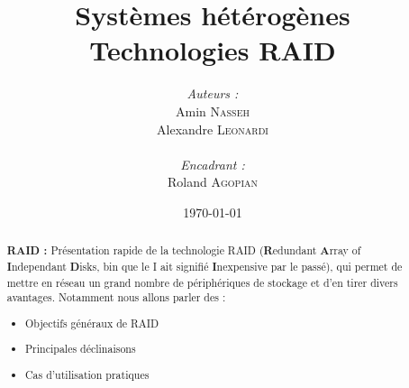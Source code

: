 \documentclass[a4paper,11pt]{article}
\title{
  \textbf{Systèmes hétérogènes}\\
  Technologies RAID
}
\author{
\begin{minipage}{0.4\textwidth}
	\begin{flushleft} \large
		\emph{Auteurs :}\\
                Amin \textsc{Nasseh}\\
		Alexandre \textsc{Leonardi}\\
	\end{flushleft}
\end{minipage}
\begin{minipage}{0.4\textwidth}
	\begin{flushright} \large
		\emph{Encadrant :} \\
		Roland \textsc{Agopian}\\
	\end{flushright}
\end{minipage}
}
\date{\today}
\begin{document}
\maketitle
\thispagestyle{empty}
\begin{abstract}
\textbf{RAID :} Présentation rapide de la technologie RAID (\textbf{R}edundant \textbf{A}rray of \textbf{I}ndependant \textbf{D}isks, bin que le I ait signifié \textbf{I}nexpensive par le passé), qui permet de mettre en réseau un grand nombre de périphériques de stockage et d'en tirer divers avantages. Notamment nous allons parler des :
\begin{itemize}
	\item Objectifs généraux de RAID
    \item Principales déclinaisons 
    \item Cas d'utilisation pratiques
\end{itemize}
\end{abstract}
\pagebreak

\tableofcontents
\pagebreak



\pagebreak

\pagebreak

\pagebreak

\pagebreak

\end{document}
